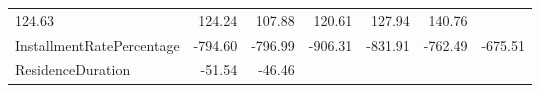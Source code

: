 \documentclass[]{article}
\begin{document}
\begin{longtable}[]{@{}lrrrrrr@{}}
\begin{minipage}[t]{0.10\columnwidth}
124.63\strut
\end{minipage} & \begin{minipage}[t]{0.08\columnwidth}\raggedleft\strut
124.24\strut
\end{minipage} & \begin{minipage}[t]{0.08\columnwidth}\raggedleft\strut
107.88\strut
\end{minipage} & \begin{minipage}[t]{0.08\columnwidth}\raggedleft\strut
120.61\strut
\end{minipage} & \begin{minipage}[t]{0.08\columnwidth}\raggedleft\strut
127.94\strut
\end{minipage} & \begin{minipage}[t]{0.08\columnwidth}\raggedleft\strut
140.76\strut
\end{minipage}\tabularnewline
\begin{minipage}[t]{0.31\columnwidth}\raggedright\strut
InstallmentRatePercentage\strut
\end{minipage} & \begin{minipage}[t]{0.10\columnwidth}\raggedleft\strut
-794.60\strut
\end{minipage} & \begin{minipage}[t]{0.08\columnwidth}\raggedleft\strut
-796.99\strut
\end{minipage} & \begin{minipage}[t]{0.08\columnwidth}\raggedleft\strut
-906.31\strut
\end{minipage} & \begin{minipage}[t]{0.08\columnwidth}\raggedleft\strut
-831.91\strut
\end{minipage} & \begin{minipage}[t]{0.08\columnwidth}\raggedleft\strut
-762.49\strut
\end{minipage} & \begin{minipage}[t]{0.08\columnwidth}\raggedleft\strut
-675.51\strut
\end{minipage}\tabularnewline
\begin{minipage}[t]{0.31\columnwidth}\raggedright\strut
ResidenceDuration\strut
\end{minipage} & \begin{minipage}[t]{0.10\columnwidth}\raggedleft\strut
-51.54\strut
\end{minipage} & \begin{minipage}[t]{0.08\columnwidth}\raggedleft\strut
-46.46\strut
\end{minipage} & \begin{minipage}[t]{0.08\columnwidth}\raggedleft\strut

\end{minipage}
\end{longtable}
\end{document}
